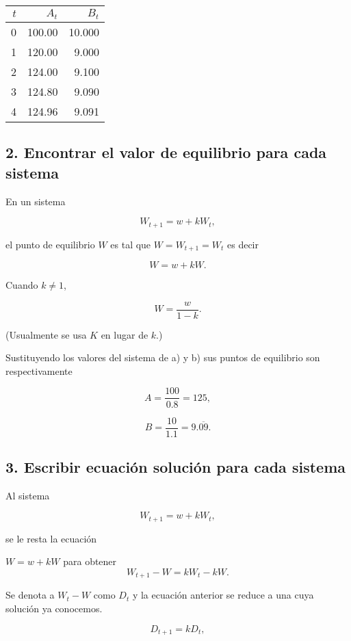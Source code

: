 \documentclass[11pt]{article}
\begin{document}
    \begin{tabular}{rrr}
\toprule
 $t$ &  $A_t$ &  $B_t$ \\
\midrule
   0 & 100.00 & 10.000 \\
   1 & 120.00 &  9.000 \\
   2 & 124.00 &  9.100 \\
   3 & 124.80 &  9.090 \\
   4 & 124.96 &  9.091 \\
\bottomrule
\end{tabular}

    \hypertarget{encontrar-el-valor-de-equilibrio-para-cada-sistema}{%
\subsection*{2. Encontrar el valor de equilibrio para cada
sistema}\label{encontrar-el-valor-de-equilibrio-para-cada-sistema}}

En un sistema

\[W_{t+1} = w + k W_t,\]

el punto de equilibrio \(W\) es tal que \(W = W_{t+1} = W_t\) es decir

\[W = w + kW.\]

Cuando \(k\neq 1\),

\[W = \frac{w}{1-k}.\]

(Usualmente se usa \(K\) en lugar de \(k\).)

    Sustituyendo los valores del sistema de a) y b) sus puntos de equilibrio
son respectivamente

\[A = \frac{100}{0.8} = 125,\]

\[B = \frac{10}{1.1} = 9.\overline{09}.\]

    \hypertarget{escribir-ecuaciuxf3n-soluciuxf3n-para-cada-sistema}{%
\subsection*{3. Escribir ecuación solución para cada
sistema}\label{escribir-ecuaciuxf3n-soluciuxf3n-para-cada-sistema}}

Al sistema

\[W_{t+1} = w + k W_t,\]

se le resta la ecuación

\(W = w + kW\) para obtener \[W_{t+1}-W = k W_t-kW.\]

Se denota a \(W_t-W\) como \(D_t\) y la ecuación anterior se reduce a
una cuya solución ya conocemos.

\[D_{t+1} = k D_t,\]
\end{document}
